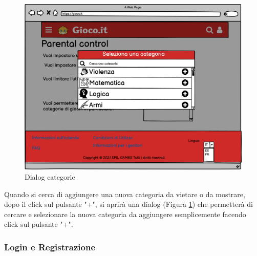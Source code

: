 \documentclass[../Report.tex]{subfiles}
\begin{document}
        \begin{figure}[H]
            \centering
            \includegraphics[width=\textwidth]{WParentalControlDialog.png}
            \caption{Dialog categorie}
            \label{fig: parental control dialog}
        \end{figure}

    Quando si cerca di aggiungere una nuova categoria da vietare o da mostrare, dopo il click sul pulsante "+", si aprirà una dialog (Figura \ref{fig: parental control dialog}) che permetterà di cercare e selezionare la nuova categoria da aggiungere semplicemente facendo click sul pulsante "+".\\
    
    \newpage

    \subsubsection{Login e Registrazione}
\end{document}
